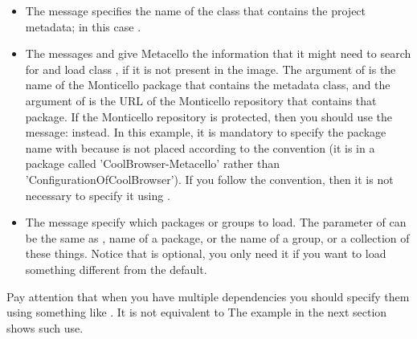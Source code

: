 \documentclass[a4paper,10pt,twoside]{book}
\begin{document}
\begin{itemize}
\item The message  specifies the name of the class that contains the project metadata; in this case .

\item The messages  and  give Metacello the information  that it might need to search for and load class , if it is not present in the image.  The argument of  is the name of the Monticello package that contains the metadata class, and the argument of  is the URL of the Monticello repository that contains that package.
If the Monticello repository is protected, then you should use the message:  instead.
In this example, it is mandatory to specify the package name with  because  is not placed according to the convention (it is in a package called 'CoolBrowser-Metacello' rather than 'ConfigurationOfCoolBrowser'). If you follow the convention, then it is not necessary to specify it using .

\item The message  specify which packages or groups to load.  The parameter of  can be the same as , \ie name of a package, or the name of a group, or a collection of these things. Notice that  is optional, you only need it if you want to load something different from the default. 


\end{itemize}

Pay attention that when you have multiple dependencies you should specify them using something like .
It is not equivalent to 
The example in the next section shows such use.
\end{document}
